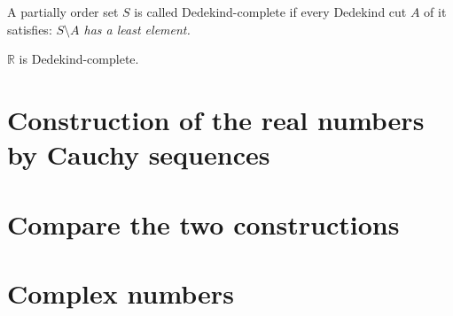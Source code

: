 \begin{definition}
    A partially order set $S$ is called Dedekind-complete if every Dedekind cut $A$ of it satisfies: \textit{$S\setminus A$ has a least element.}
\end{definition}

\begin{theorem}
    $\mathbb{R}$ is Dedekind-complete.
\end{theorem}

\section{Construction of the real numbers by Cauchy sequences}

\section{Compare the two constructions}

\section{Complex numbers}
